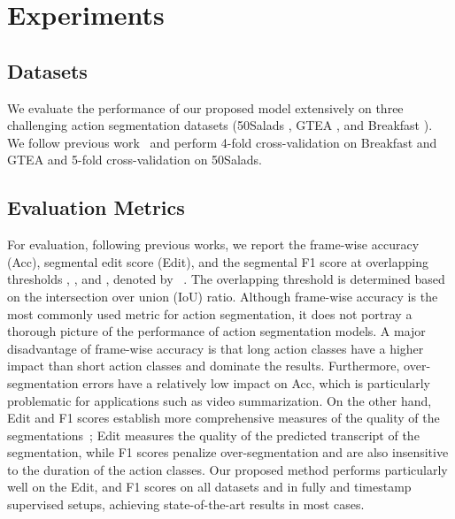 \section{Experiments}

\subsection{Datasets}
We evaluate the performance of our proposed model extensively on three challenging action segmentation datasets (50Salads \cite{stein2013combining}, GTEA \cite{fathi2011learning}, and Breakfast \cite{kuehne2014language}).  
We follow previous work~\cite{asrf,asformer,li2020ms,farha2019ms,wang2020boundary,chen2020action} and perform 4-fold cross-validation on Breakfast and GTEA and 5-fold cross-validation on 50Salads.

\subsection{Evaluation Metrics}
For evaluation,  following previous works, we report the  frame-wise accuracy (Acc), segmental edit score (Edit), and the segmental F1 score at overlapping thresholds , , and , denoted by ~\cite{lea2017temporal}. The overlapping threshold is determined based on the intersection over union (IoU) ratio. 
Although frame-wise accuracy is the most commonly used metric for action segmentation, it does not portray a thorough picture of the performance of action segmentation models. 
A major disadvantage of frame-wise accuracy is that long action classes have a higher impact than short action classes and dominate the results. Furthermore, over-segmentation errors have a relatively low impact on Acc, which is particularly problematic for applications such as video summarization.  
On the other hand, Edit and F1 scores establish more comprehensive measures of the quality of the segmentations~\cite{lea2017temporal}; Edit measures the quality of the predicted transcript of the segmentation, while F1 scores penalize over-segmentation and are also insensitive to the duration of the action classes. Our proposed method performs particularly well on the Edit, and F1 scores on all datasets and in fully and timestamp supervised setups, achieving state-of-the-art results in most cases.


